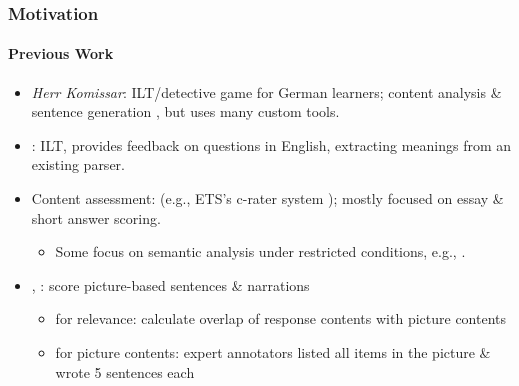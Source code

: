 \documentclass{beamer}
\begin{document}
\begin{frame}
\frametitle{Motivation}
\framesubtitle{Previous Work}

\begin{itemize}
\item \textit{Herr Komissar}: ILT/detective game for German learners;
content analysis \& sentence generation \citep{desmedt:95}, but
uses many custom tools. 
\item \citet{petersen:10}: ILT, provides feedback on questions in English,
extracting meanings from an existing parser.
\item Content assessment: (e.g., ETS's c-rater system \citep{leacock:chodorow:03}); mostly focused on essay \& short answer scoring. 
  \begin{itemize}
  \item Some focus on semantic analysis under restricted conditions,
    e.g., \citep{Meurers.Ziai.ea-11}.
  \end{itemize}
\item \citet{somasundaran:chodorow:14}, \citet{somasundaran:ea:15}:
  score picture-based sentences \& narrations
  \begin{itemize}
  \item for relevance: calculate overlap of response contents with
    picture contents
  \item for picture contents: expert annotators listed all items in the
    picture \& wrote 5 sentences each
  \end{itemize}
\end{itemize}

\end{frame}
\end{document}
